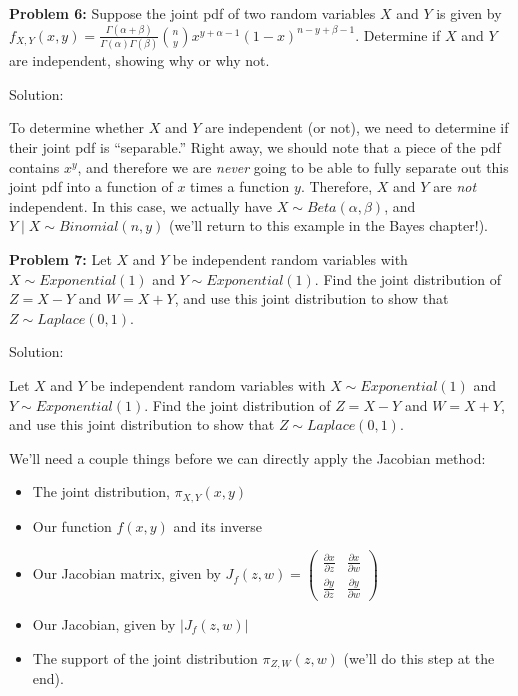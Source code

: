 \documentclass[
  letterpaper,
  DIV=11,
  numbers=noendperiod]{scrreprt}
\begin{document}
\textbf{Problem 6:} Suppose the joint pdf of two random variables \(X\)
and \(Y\) is given by
\(f_{X,Y}(x,y) = \frac{\Gamma(\alpha + \beta)}{\Gamma(\alpha) \Gamma(\beta)} \binom{n}{y} x^{y + \alpha - 1} (1-x)^{n-y + \beta - 1}\).
Determine if \(X\) and \(Y\) are independent, showing why or why not.

Solution:

To determine whether \(X\) and \(Y\) are independent (or not), we need
to determine if their joint pdf is ``separable.'' Right away, we should
note that a piece of the pdf contains \(x^y\), and therefore we are
\emph{never} going to be able to fully separate out this joint pdf into
a function of \(x\) times a function \(y\). Therefore, \(X\) and \(Y\)
are \emph{not} independent. In this case, we actually have
\(X \sim Beta(\alpha, \beta)\), and \(Y \mid X \sim Binomial(n, y)\)
(we'll return to this example in the Bayes chapter!).

\textbf{Problem 7:} Let \(X\) and \(Y\) be independent random variables
with \(X \sim Exponential(1)\) and \(Y \sim Exponential(1)\). Find the
joint distribution of \(Z = X - Y\) and \(W = X + Y\), and use this
joint distribution to show that \(Z \sim Laplace(0, 1)\).

Solution:

Let \(X\) and \(Y\) be independent random variables with
\(X \sim Exponential(1)\) and \(Y \sim Exponential(1)\). Find the joint
distribution of \(Z = X - Y\) and \(W = X + Y\), and use this joint
distribution to show that \(Z \sim Laplace(0, 1)\).

We'll need a couple things before we can directly apply the Jacobian
method:

\begin{itemize}
\item
  The joint distribution, \(\pi_{X,Y}(x,y)\)
\item
  Our function \(f(x,y)\) and its inverse
\item
  Our Jacobian matrix, given by
  \(J_{f}(z,w) = \begin{pmatrix} \frac{\partial x}{\partial z} & \frac{\partial x}{\partial w} \\\frac{\partial y}{\partial z} & \frac{\partial y}{\partial w} \end{pmatrix}\)
\item
  Our Jacobian, given by \(\bigg| J_{f}(z,w) \bigg|\)
\item
  The support of the joint distribution \(\pi_{Z,W}(z,w)\) (we'll do
  this step at the end).
\end{itemize}
\end{document}
